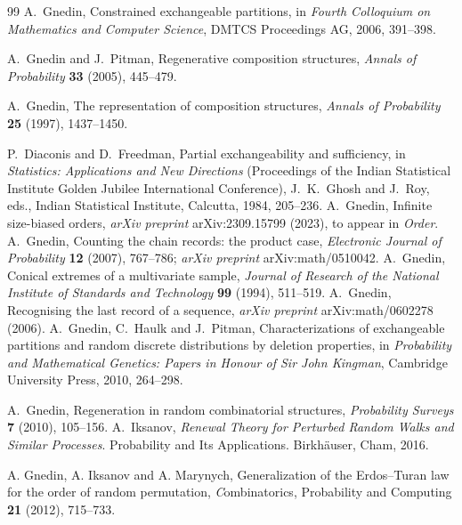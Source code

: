 \documentclass[11pt]{article}
\theoremstyle{plain}
\theoremstyle{definition}
\begin{document}
\begin{thebibliography}{99}
 A.~Gnedin, Constrained exchangeable partitions, in \emph{Fourth Colloquium on Mathematics and Computer Science}, DMTCS Proceedings AG, 2006, 391--398.

 A.~Gnedin and J.~Pitman, Regenerative composition structures, \emph{Annals of Probability} \textbf{33} (2005), 445--479.

 A.~Gnedin, The representation of composition structures, \emph{Annals of Probability} \textbf{25} (1997), 1437--1450.

 P.~Diaconis and D.~Freedman, Partial exchangeability and sufficiency, in \emph{Statistics: Applications and New Directions} (Proceedings of the Indian Statistical Institute Golden Jubilee International Conference), J.~K.~Ghosh and J.~Roy, eds., Indian Statistical Institute, Calcutta, 1984, 205--236.
 A.~Gnedin, Infinite size-biased orders, \emph{arXiv preprint} arXiv:2309.15799 (2023), to appear in \emph{Order}.
 A.~Gnedin, Counting the chain records: the product case, \emph{Electronic Journal of Probability} \textbf{12} (2007), 767--786; \emph{arXiv preprint} arXiv:math/0510042.
 A.~Gnedin, Conical extremes of a multivariate sample, \emph{Journal of Research of the National Institute of Standards and Technology} \textbf{99} (1994), 511--519.
 A.~Gnedin, Recognising the last record of a sequence, \emph{arXiv preprint} arXiv:math/0602278 (2006).
 A.~Gnedin, C.~Haulk and J.~Pitman, Characterizations of exchangeable partitions and random discrete distributions by deletion properties, in \emph{Probability and Mathematical Genetics: Papers in Honour of Sir John Kingman}, Cambridge University Press, 2010, 264--298.

 A.~Gnedin, Regeneration in random combinatorial structures, \emph{Probability Surveys} \textbf{7} (2010), 105--156.
A.~Iksanov,
{\em Renewal Theory for Perturbed Random Walks and Similar
  Processes}.
Probability and Its Applications. Birkh{\"a}user, Cham, 2016.

A. Gnedin, A. Iksanov and A. Marynych,   Generalization of the Erdos–Turan law for the order of random permutation, {\emph Combinatorics, Probability and Computing} \textbf{21}  (2012),  715--733.




\end{thebibliography}
\end{document}
